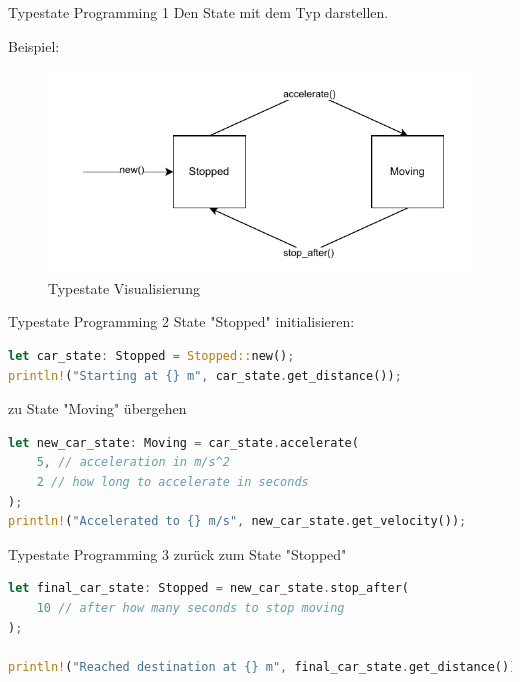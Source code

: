 
\begin{frame}[fragile,t]{Typestate Programming 1}
    Den State mit dem Typ darstellen.

    \pause Beispiel:
    \begin{figure}
        \centering
        \includegraphics{images/typestate.drawio}
        \caption{Typestate Visualisierung}
        \label{fig:typestate-programming-1}
    \end{figure}
\end{frame}

\begin{frame}[fragile,t]{Typestate Programming 2}
    State "Stopped" initialisieren:
    \begin{lstlisting}[language=Rust,escapechar=@,label={lst:typestate-programming-2-1}]
let car_state: Stopped = Stopped::new();
println!("Starting at {} m", car_state.get_distance());
\end{lstlisting}

    \pause zu State "Moving" übergehen
    \begin{lstlisting}[language=Rust,escapechar=@,label={lst:typestate-programming-2-2}]
let new_car_state: Moving = car_state.accelerate(
    5, // acceleration in m/s^2
    2 // how long to accelerate in seconds
);
println!("Accelerated to {} m/s", new_car_state.get_velocity());
\end{lstlisting}
\end{frame}

\begin{frame}[fragile,t]{Typestate Programming 3}
    zurück zum State "Stopped"
    \begin{lstlisting}[language=Rust,escapechar=@,label={lst:typestate-programming-3-1}]
let final_car_state: Stopped = new_car_state.stop_after(
    10 // after how many seconds to stop moving
);

println!("Reached destination at {} m", final_car_state.get_distance());
    \end{lstlisting}

\end{frame}

